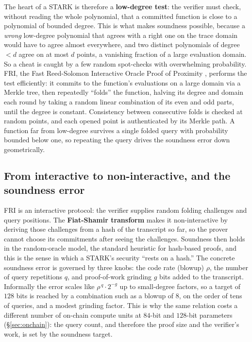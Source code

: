 \documentclass[11pt]{article}
\begin{document}
The heart of a STARK is therefore a \textbf{low-degree test}: the verifier must check,
without reading the whole polynomial, that a committed function is close to a polynomial
of bounded degree. This is what makes soundness possible, because a \emph{wrong}
low-degree polynomial that agrees with a right one on the trace domain would have to agree
almost everywhere, and two distinct polynomials of degree $< d$ agree on at most $d$
points, a vanishing fraction of a large evaluation domain. So a cheat is caught by a few
random spot-checks with overwhelming probability. FRI, the Fast Reed-Solomon Interactive
Oracle Proof of Proximity \cite{fri}, performs the test efficiently: it commits to the
function's evaluations on a large domain via a Merkle tree, then repeatedly ``folds'' the
function, halving its degree and domain each round by taking a random linear combination
of its even and odd parts, until the degree is constant. Consistency between consecutive
folds is checked at random points, and each opened point is authenticated by its Merkle
path. A function far from low-degree survives a single folded query with probability
bounded below one, so repeating the query drives the soundness error down geometrically.

\subsection{From interactive to non-interactive, and the soundness error}

FRI is an interactive protocol: the verifier supplies random folding challenges and query
positions. The \textbf{Fiat-Shamir transform} makes it non-interactive by deriving those
challenges from a hash of the transcript so far, so the prover cannot choose its
commitments after seeing the challenges. Soundness then holds in the random-oracle model,
the standard heuristic for hash-based proofs, and this is the sense in which a STARK's
security ``rests on a hash.'' The concrete soundness error is governed by three knobs: the
code rate (blowup) $\rho$, the number of query repetitions $q$, and proof-of-work grinding
$g$ bits added to the transcript. Informally the error scales like
$\rho^{\,q} \cdot 2^{-g}$ up to small-degree factors, so a target of $128$ bits is reached
by a combination such as a blowup of $8$, on the order of tens of queries, and a modest
grinding factor. This is why the same relation costs a different number of on-chain
compute units at $84$-bit and $128$-bit parameters (\S\ref{sec:onchain}): the query count,
and therefore the proof size and the verifier's work, is set by the soundness target.
\end{document}
